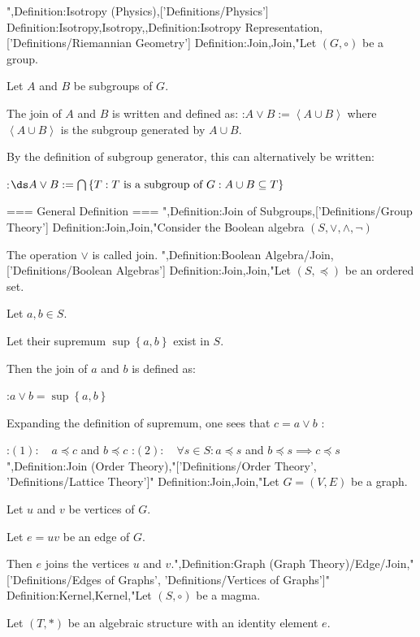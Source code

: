 ",Definition:Isotropy (Physics),['Definitions/Physics']
Definition:Isotropy,Isotropy,,Definition:Isotropy Representation,['Definitions/Riemannian Geometry']
Definition:Join,Join,"Let $\left( G, \circ \right)$ be a group.

Let $A$ and $B$ be subgroups of $G$.


The join of $A$ and $B$ is written and defined as:
:$A \vee B := {\left\langle A \cup B \right\rangle}$
where ${\left\langle A \cup B \right\rangle}$ is the subgroup generated by $A \cup B$.


By the definition of subgroup generator, this can alternatively be written:

:$\ds A \vee B := \bigcap \left\lbrace T: T \text { is a subgroup of } G: A \cup B \subseteq T \right\rbrace$


=== General Definition ===
",Definition:Join of Subgroups,['Definitions/Group Theory']
Definition:Join,Join,"Consider the Boolean algebra $\left( S, \vee, \wedge, \neg \right)$


The operation $\vee$ is called join.
",Definition:Boolean Algebra/Join,['Definitions/Boolean Algebras']
Definition:Join,Join,"Let $\left( S, \preceq \right)$ be an ordered set.

Let $a, b \in S$.

Let their supremum $\sup \left\lbrace a, b \right\rbrace$ exist in $S$.


Then the join of $a$ and $b$ is defined as:

:$a \vee b = \sup \left\lbrace a, b \right\rbrace$


Expanding the definition of supremum, one sees that $c = a \vee b$ :

:$(1): \quad a \preceq c$ and $b \preceq c$
:$(2): \quad \forall s \in S: a \preceq s$ and $b \preceq s \implies c \preceq s$",Definition:Join (Order Theory),"['Definitions/Order Theory', 'Definitions/Lattice Theory']"
Definition:Join,Join,"Let $G = \left( V, E \right)$ be a graph.

Let $u$ and $v$ be vertices of $G$.

Let $e = u v$ be an edge of $G$.


Then $e$ joins the vertices $u$ and $v$.",Definition:Graph (Graph Theory)/Edge/Join,"['Definitions/Edges of Graphs', 'Definitions/Vertices of Graphs']"
Definition:Kernel,Kernel,"Let $\left( S, \circ \right)$ be a magma.

Let $\left( T, * \right)$ be an algebraic structure with an identity element $e$.

